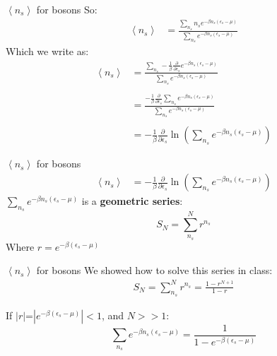 \documentclass{beamer}
\begin{document}
\begin{frame}{$\left<n_s\right>$ for bosons}
	So:
	\begin{align*}
		\left<n_s\right>
		&=\frac{\sum_{n_s}n_se^{-\beta n_s\left(\epsilon_s-\mu\right)}}{\sum_{n_s}e^{-\beta n_s\left(\epsilon_s-\mu\right)}}
	\end{align*}
	Which we write as:
	\begin{align*}
		\left<n_s\right>&=\frac{\sum_{n_s}-\frac{1}{\beta}\frac{\partial}{\partial \epsilon_s}e^{-\beta n_s\left(\epsilon_s-\mu\right)}}{\sum_{n_s}e^{-\beta n_s\left(\epsilon_s-\mu\right)}}\\\\
		&=\frac{-\frac{1}{\beta}\frac{\partial}{\partial \epsilon_s}\sum_{n_s}e^{-\beta n_s\left(\epsilon_s-\mu\right)}}{\sum_{n_s}e^{-\beta n_s\left(\epsilon_s-\mu\right)}}\\\\
		&=-\frac{1}{\beta}\frac{\partial}{\partial \epsilon_s}\ln{\left(\sum_{n_s}e^{-\beta n_s\left(\epsilon_s-\mu\right)}\right)}
	\end{align*}
	
\end{frame}




\begin{frame}{$\left<n_s\right>$ for bosons}
	\begin{align*}
		\left<n_s\right>&=-\frac{1}{\beta}\frac{\partial}{\partial \epsilon_s}\ln{\left(\sum_{n_s}e^{-\beta n_s\left(\epsilon_s-\mu\right)}\right)}
	\end{align*}
	$\sum_{n_s}e^{-\beta n_s\left(\epsilon_s-\mu\right)}$ is a \textbf{geometric series}:
	\begin{equation*}
		S_N=\sum_{n_s}^{N}r^{n_s}
	\end{equation*}
Where $r=e^{-\beta\left(\epsilon_s-\mu\right)}$
\end{frame}



\begin{frame}{$\left<n_s\right>$ for bosons}
	We showed how to solve this series in class:
	\begin{align*}
		S_N=\sum_{n_s}^{N}r^{n_s}=\frac{1-r^{N+1}}{1-r}
	\end{align*}

If $|r|$=$\left|e^{-\beta\left(\epsilon_s-\mu\right)}\right|<1$, and $N>>1$:
\begin{equation*}
\sum_{n_s}e^{-\beta n_s\left(\epsilon_s-\mu\right)}=\frac{1}{1-e^{-\beta\left(\epsilon_s-\mu\right)}}
\end{equation*}
\end{frame}
\end{document}
